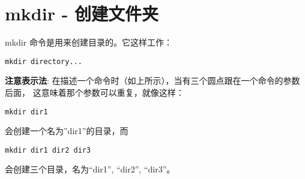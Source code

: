 \section{mkdir - 创建文件夹} %
\label{sec:mkdir_创建文件夹}
mkdir 命令是用来创建目录的。它这样工作：
\begin{lstlisting}
mkdir directory...
\end{lstlisting}
\par \textbf{注意表示法}: 在描述一个命令时（如上所示），当有三个圆点跟在一个命令的参数后面， 这意味着那个参数可以重复，就像这样：
\begin{lstlisting}
mkdir dir1
\end{lstlisting}
\par 会创建一个名为”dir1”的目录，而
\begin{lstlisting}
mkdir dir1 dir2 dir3
\end{lstlisting}
\par 会创建三个目录，名为``dir1'', ``dir2'', ``dir3''。


